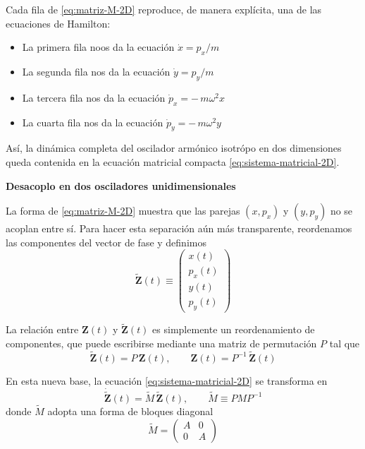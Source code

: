\documentclass{article}
\begin{document}
Cada fila de \eqref{eq:matriz-M-2D} reproduce, de manera explícita, una de las
ecuaciones de Hamilton:

\begin{itemize}
  \item[$\bullet$] La primera fila noos da la ecuación
  $\dot{x} = p_{x}/m$  
  \item[$\bullet$] La segunda fila nos da la ecuación
  $\dot{y} = p_{y}/m$  
  \item[$\bullet$] La tercera fila nos da la ecuación
  $\dot{p}_{x} = -\,m\omega^{2}x$  
  \item[$\bullet$] La cuarta fila nos da la ecuación
  $\dot{p}_{y} = -\,m\omega^{2}y$
\end{itemize}

Así, la dinámica completa del oscilador armónico isotrópo en dos dimensiones
queda contenida en la ecuación matricial compacta \eqref{eq:sistema-matricial-2D}.

\textcolor{trueblue}{\textbf{Desacoplo en dos osciladores unidimensionales}}

La forma de \eqref{eq:matriz-M-2D} muestra que las parejas $(x,p_{x})$ y
$(y,p_{y})$ no se acoplan entre sí. Para hacer esta separación aún más
transparente, reordenamos las componentes del vector de fase y definimos
\begin{equation}
\widetilde{\mathbf{Z}}(t) \equiv
\begin{pmatrix}
x(t) \\[4pt]
p_{x}(t) \\[4pt]
y(t) \\[4pt]
p_{y}(t)
\end{pmatrix}
\label{eq:vector-fase-2D-ordenado}
\end{equation}

La relación entre $\mathbf{Z}(t)$ y $\widetilde{\mathbf{Z}}(t)$ es simplemente
un reordenamiento de componentes, que puede escribirse mediante una matriz de
permutación $P$ tal que
\begin{equation}
\widetilde{\mathbf{Z}}(t) = P\,\mathbf{Z}(t),
\qquad
\mathbf{Z}(t) = P^{-1}\,\widetilde{\mathbf{Z}}(t)
\label{eq:perm-2D}
\end{equation}

En esta nueva base, la ecuación \eqref{eq:sistema-matricial-2D} se transforma en
\begin{equation}
\dot{\widetilde{\mathbf{Z}}}(t)
=
\widetilde{M}\,\widetilde{\mathbf{Z}}(t),
\qquad
\widetilde{M} \equiv P M P^{-1}
\label{eq:sistema-matricial-2D-tilde}
\end{equation}
donde $\widetilde{M}$ adopta una forma de bloques diagonal
\begin{equation}
\widetilde{M} =
\begin{pmatrix}
A & 0 \\[4pt]
0 & A
\end{pmatrix}
\label{eq:M-tilde-bloques}
\end{equation}
\end{document}
